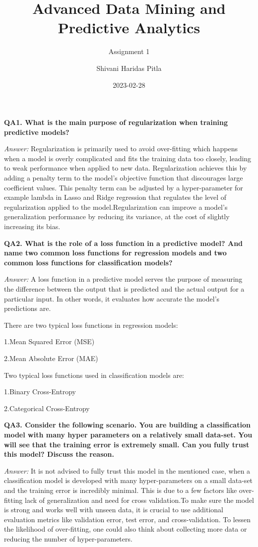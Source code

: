 \documentclass[
]{article}
\title{Advanced Data Mining and Predictive Analytics}
\subtitle{Assignment 1}
\author{Shivani Haridas Pitla}
\date{2023-02-28}
\begin{document}
\maketitle

\textbf{QA1. What is the main purpose of regularization when training
predictive models?}

\emph{Answer:} Regularization is primarily used to avoid over-fitting
which happens when a model is overly complicated and fits the training
data too closely, leading to weak performance when applied to new data.
Regularization achieves this by adding a penalty term to the model's
objective function that discourages large coefficient values. This
penalty term can be adjusted by a hyper-parameter for example lambda in
Lasso and Ridge regression that regulates the level of regularization
applied to the model.Regularization can improve a model's generalization
performance by reducing its variance, at the cost of slightly increasing
its bias.

\textbf{QA2. What is the role of a loss function in a predictive model?
And name two common loss functions for regression models and two common
loss functions for classification models?}

\emph{Answer:} A loss function in a predictive model serves the purpose
of measuring the difference between the output that is predicted and the
actual output for a particular input. In other words, it evaluates how
accurate the model's predictions are.

There are two typical loss functions in regression models:

1.Mean Squared Error (MSE)

2.Mean Absolute Error (MAE)

Two typical loss functions used in classification models are:

1.Binary Cross-Entropy

2.Categorical Cross-Entropy

\textbf{QA3. Consider the following scenario. You are building a
classification model with many hyper parameters on a relatively small
data-set. You will see that the training error is extremely small. Can
you fully trust this model? Discuss the reason.}

\emph{Answer:} It is not advised to fully trust this model in the
mentioned case, when a classification model is developed with many
hyper-parameters on a small data-set and the training error is
incredibly minimal. This is due to a few factors like over-fitting lack
of generalization and need for cross validation.To make sure the model
is strong and works well with unseen data, it is crucial to use
additional evaluation metrics like validation error, test error, and
cross-validation. To lessen the likelihood of over-fitting, one could
also think about collecting more data or reducing the number of
hyper-parameters.
\end{document}
